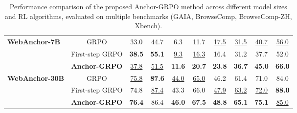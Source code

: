 \begin{table}[t]
\begin{tabular}{lccccccccc}
\midrule
\multirow{3}{*}{\textbf{WebAnchor-7B}}
& GRPO & 33.0 & 44.7 & 6.3 & 11.7 & \underline{17.5} & \underline{31.5} & \underline{40.7} & \underline{56.0} \\
& First-step GRPO & \textbf{38.5} & \textbf{55.1} & \underline{9.3} & \underline{16.3} & 16.4 & 31.2 & 37.7 & 52.0\\
\rowcolor{lightblue} &  \textbf{Anchor-GRPO} & \underline{37.8} & \underline{51.5} & \textbf{11.6} & \textbf{20.7} & \textbf{23.8} & \textbf{36.7} &  \textbf{45.0} & \textbf{66.0} \\
\midrule
\multirow{3}{*}{\textbf{WebAnchor-30B}}
& GRPO & \underline{75.8} & \textbf{87.6} & \underline{44.0} & \underline{65.0} & 46.2 &61.4 &71.0 & 84.0 \\
& First-step GRPO & 74.8 & \underline{87.4} & 43.3 & 66.0 & \underline{47.9} & \underline{63.2}  & \underline{72.0} & \textbf{88.0} \\
\rowcolor{lightblue} &  \textbf{Anchor-GRPO} & \textbf{76.4} & 86.4 & \textbf{46.0} & \textbf{67.5} & \textbf{48.8} & \textbf{65.1} & \textbf{75.1} & \underline{85.0} \\
\bottomrule
\end{tabular}
\caption{Performance comparison of the proposed Anchor-GRPO method across different model sizes and RL algorithms, evaluated on multiple benchmarks (GAIA, BrowseComp, BrowseComp-ZH, Xbench).}
\label{tab:anchor_grpo_main}
\end{table}
